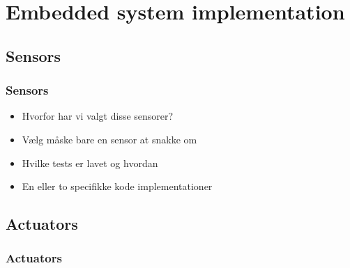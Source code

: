 \section{Embedded system implementation}
\subsection{Sensors}
\begin{frame}
	\frametitle{Sensors}
	\begin{itemize}
		\item Hvorfor har vi valgt disse sensorer?
		\item Vælg måske bare en sensor at snakke om
		\item Hvilke tests er lavet og hvordan
		\item En eller to specifikke kode implementationer
	\end{itemize}
\end{frame}
\subsection{Actuators}
\begin{frame}
	\frametitle{Actuators}
\end{frame}